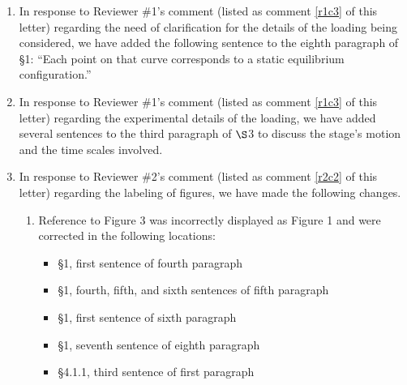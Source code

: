 \documentclass[11pt,letterpaper]{report}
\begin{document}
\begin{enumerate}[label=\textit{Mc.\arabic*}]
%
\item \label{a1} In response to Reviewer \#1's comment (listed as comment \ref{r1c3} of this letter) regarding the need of clarification for the details of the loading being considered,  we have added the following sentence to the eighth paragraph of \S1: ``Each point on that curve corresponds to a static equilibrium configuration.''
%
\item \label{a2} In response to Reviewer \#1's comment (listed as comment \ref{r1c3} of this letter) regarding the experimental details of the loading, we have added several sentences to the third paragraph of $\S$3 to discuss the stage's motion and the time scales involved.
%
\item \label{a3} In response to Reviewer \#2's comment (listed as comment \ref{r2c2} of this letter) regarding the labeling of figures, we have made the following changes.
\begin{enumerate}[label=\textit{Mc.3.\roman*}]
    \item Reference to Figure 3 was incorrectly displayed as Figure 1 and were corrected in the following locations:
    \begin{itemize}
        \item \S1, first sentence of fourth paragraph
        \item \S1, fourth, fifth, and sixth sentences of fifth paragraph
        \item \S1, first sentence of sixth paragraph
        \item \S1, seventh sentence of eighth paragraph
        \item \S4.1.1, third sentence of first paragraph
\end{itemize}


\end{enumerate}
\end{enumerate}
\end{document}
